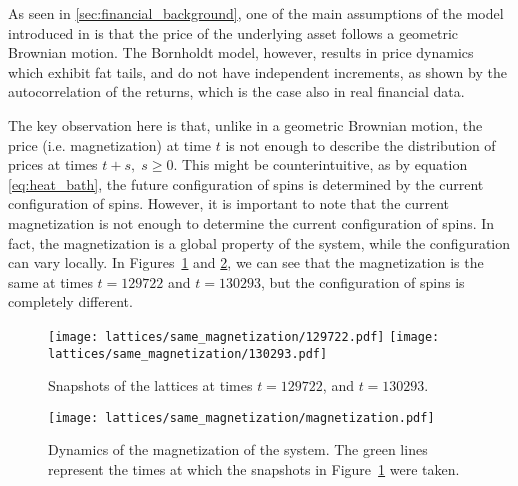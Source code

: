 As seen in \ref{sec:financial_background}, one of the main assumptions of the model introduced in \cite{black_scholes} is that the price of the underlying asset follows a geometric Brownian motion. The Bornholdt model, however, results in price dynamics which exhibit fat tails, and do not have independent increments, as shown by the autocorrelation of the returns, which is the case also in real financial data.

The key observation here is that, unlike in a geometric Brownian motion, the price (i.e. magnetization) at time $t$ is not enough to describe the distribution of prices at times $t+s, \; s\geq 0$. This might be counterintuitive, as by equation \ref{eq:heat_bath}, the future configuration of spins is determined by the current configuration of spins. However, it is important to note that the current magnetization is not enough to determine the current configuration of spins. In fact, the magnetization is a global property of the system, while the configuration can vary locally. In Figures~\ref{fig:lattices_m100} and \ref{fig:magnetization_m100}, we can see that the magnetization is the same at times $t=129722$ and $t=130293$, but the configuration of spins is completely different.

\begin{figure}[H]
    \centering
    \texttt{[image: lattices/same\_magnetization/129722.pdf]}
    \texttt{[image: lattices/same\_magnetization/130293.pdf]}
    \caption{Snapshots of the lattices at times $t=129722$, and $t=130293$.}
    \label{fig:lattices_m100}
\end{figure}

\begin{figure}[H]
    \centering
    \texttt{[image: lattices/same\_magnetization/magnetization.pdf]}
    \caption{Dynamics of the magnetization of the system. The green lines represent the times at which the snapshots in Figure~\ref{fig:lattices_m100} were taken.}
    \label{fig:magnetization_m100}
\end{figure}